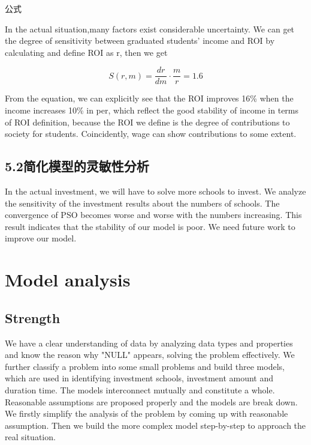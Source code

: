 \documentclass{mcmthesis}
\begin{document}
公式

In the actual situation,many factors exist considerable uncertainty. We can get the degree of sensitivity between graduated students' income and ROI by calculating and define ROI as r, then we get  

$$S(r,m)=\frac{dr}{dm}\cdot\frac{m}{r}=1.6$$

From the equation, we can explicitly see that the ROI improves 16\% when the income increases 10\% in per, which reflect the good stability of income in terms of
ROI definition, because the ROI we define is the degree of contributions to society for students. Coincidently, wage can show contributions to some extent.
\par

\subsection{5.2简化模型的灵敏性分析}
In the actual investment, we will have to solve more schools to invest. We analyze the sensitivity of the investment results about the numbers of schools. The convergence of PSO becomes worse and worse with the numbers increasing. This result indicates that the stability of our model is poor. We need future work to improve our model.\par

\section{Model analysis}
\subsection{Strength}
We have a clear understanding of data by analyzing data types and properties and know the reason why "NULL" appears, solving the problem effectively.
We further classify a problem into some small problems and build three models, which are used in identifying investment schools, investment amount and duration time. The models interconnect mutually and constitute a whole. 
Reasonable assumptions are proposed properly and the models are break down. We firstly simplify the analysis of the problem by coming up with reasonable assumption. Then we build the more complex model step-by-step to approach the real situation.
\end{document}
